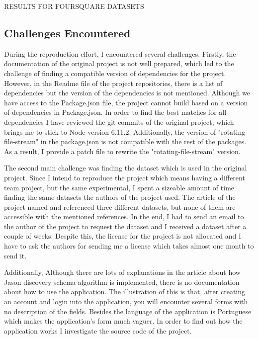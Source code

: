\documentclass[sigconf]{acmart}
\begin{document}
\begin{table}
  \caption{RESULTS FOR FOURSQUARE DATASETS}
  \label{tab:freq}
   
\end{table}
\subsection{Challenges Encountered}

During the reproduction effort, I encountered several challenges. Firstly, the documentation of the original project is not well prepared, which led to the challenge of finding a compatible version of dependencies for the project. However, in the Readme file of the project repositories, there is a list of dependencies but the version of the dependencies is not mentioned.
Although we have access to the Package.json file, the project cannot build based on a version of dependencies in Package.json. In order to find the best matches for all dependencies I have reviewed the git commits of the original project, which brings me to stick to Node version 6.11.2. Additionally, the version of  "rotating-file-stream" in the package.json is not compatible with the rest of the packages. As a result, I provide a patch file to rewrite the  "rotating-file-stream"  version.

The second main challenge was finding the dataset which is used in the original project. Since I intend to reproduce the project which means having a different team project, but the same experimental, I spent a sizeable amount of time finding the same datasets the authors of the project used. The article of the project named and referenced three different datasets, but none of them are accessible with the mentioned references. In the end, I had to send an email to the author of the project to request the dataset and I received a dataset after a couple of weeks. Despite this, the license for the project is not allocated and I have to ask the authors for sending me a license  which takes almost one month to send it.

Additionally, Although there are lots of explanations in the article about how Jason discovery schema algorithm is implemented, there is no documentation about how to use the application. The illustration of this is that, after creating an account and login into the application, you will encounter several forms with no description of the fields. Besides the language of the application is Portuguese which makes the application's form much vaguer. In order to find out how the application works I investigate the source code of the project.
\end{document}
